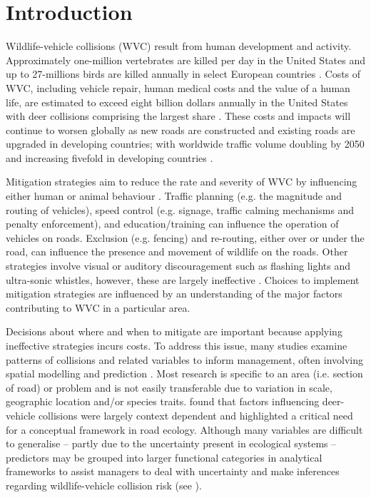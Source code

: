 \newpage
\section{Introduction}

Wildlife-vehicle collisions (WVC) result from human development and activity. Approximately one-million vertebrates are killed per day in the United States \citep{form98} and up to 27-millions birds are killed annually in select European countries \citep{erri03}.  Costs of WVC, including vehicle repair, human medical costs and the value of a human life, are estimated to exceed eight billion dollars annually in the United States \citep{huij07b} with deer collisions comprising the largest share \citep[see][]{biss08b}.  These costs and impacts will continue to worsen globally as new roads are constructed and existing roads are upgraded in developing countries; with worldwide traffic volume doubling by 2050 and increasing fivefold in developing countries \citep{rvdr15}.

Mitigation strategies aim to reduce the rate and severity of WVC by influencing either human or animal behaviour \citep[see][]{huij10}.  Traffic planning (e.g. the magnitude and routing of vehicles), speed control (e.g. signage, traffic calming mechanisms and penalty enforcement), and education/training can influence the operation of vehicles on roads.  Exclusion (e.g. fencing) and re-routing, either over or under the road, can influence the presence and movement of wildlife on the roads.  Other strategies involve visual or auditory discouragement such as flashing lights and ultra-sonic whistles, however, these are largely ineffective \citep{reev93,bend03,sche03,ramp06c}. Choices to implement mitigation strategies are influenced by an understanding of the major factors contributing to WVC in a particular area.

Decisions about where and when to mitigate are important because applying ineffective strategies incurs costs.  To address this issue, many studies examine patterns of collisions and related variables to inform management, often involving spatial modelling and prediction \citep[see][]{guns11}.  Most research is specific to an area (i.e. section of road) or problem and is not easily transferable due to variation in scale, geographic location and/or species traits. \cite{clev15} found that factors influencing deer-vehicle collisions were largely context dependent and highlighted a critical need for a conceptual framework in road ecology. Although many variables are difficult to generalise -- partly due to the uncertainty present in ecological systems -- predictors may be grouped into larger functional categories in analytical frameworks to assist managers to deal with uncertainty and make inferences regarding wildlife-vehicle collision risk (see ).

